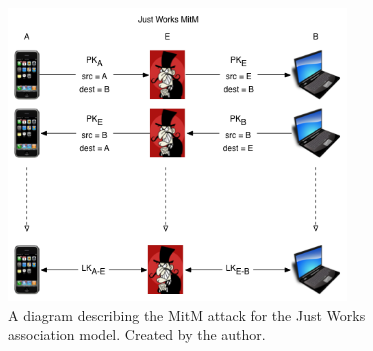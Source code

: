\documentclass{acm_proc_article-sp}
\begin{document}

\begin{figure}
    \begin{center}
        \includegraphics[width=0.8\textwidth]{diagrams/jw_mitm.png}
        \caption{A diagram describing the MitM attack for the Just Works association model. Created by the author.}
        \label{jw_mitm}
    \end{center}
\end{figure}
\end{document}
